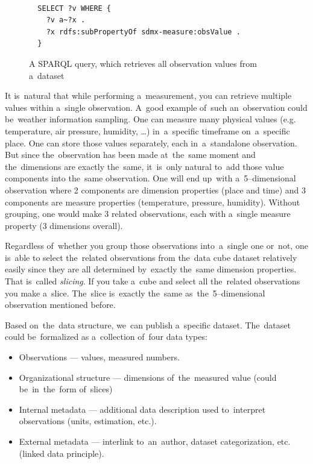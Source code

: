 \begin{figure}
\begin{verbatim}
  
  SELECT ?v WHERE {
    ?v a~?x .
    ?x rdfs:subPropertyOf sdmx-measure:obsValue .
  }

\end{verbatim}
\caption{A SPARQL query, which retrieves all observation values from a~dataset}
\label{fig:sparql-obsValue}
\end{figure}

It is~natural that while performing a~measurement, you can retrieve multiple
values within a~single observation. A~good example of~such an~observation could be~weather
information sampling. One can measure many physical values (e.g. temperature, air pressure,
humidity, …) in~a~specific timeframe on~a~specific place. One can store those values separately,
each in~a~standalone observation. But since the~observation has been made at~the~same moment
and the~dimensions are exactly the~same, it~is~only natural to~add those value components into
the~same observation. One will end up~with a~5--dimensional observation where 2 components 
are dimension properties (place and time) and 3 components are measure properties
(temperature, pressure, humidity). Without grouping, one would make 3 related observations,
each with a~single measure property (3 dimensions overall).

Regardless of~whether you group those observations into~a~single one or~not, one is~able
to select the~related observations from the~data cube dataset relatively easily since they
are all determined by~exactly the~same dimension properties. That is~called \emph{slicing}.
If you take a~cube and select all the~related observations you make a~slice. The~slice is~exactly
the~same as~the~5--dimensional observation mentioned before.

Based on~the~data structure, we~can publish a~specific dataset. The~dataset could be~formalized
as a~collection of~four data types:

\begin{itemize}
\item Observations --- values, measured numbers.
\item Organizational structure --- dimensions of~the~measured value (could be~in~the~form of~slices)
\item Internal metadata --- additional data description used to~interpret observations (units, estimation,
etc.).
\item External metadata --- interlink to~an~author, dataset categorization, etc. (linked data 
principle).
\end{itemize}

